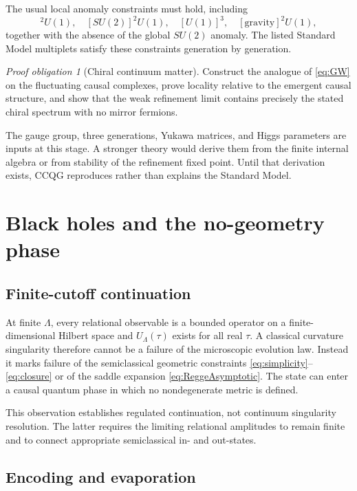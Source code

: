 \documentclass[11pt]{article}
\theoremstyle{remark}
\newtheorem{obligation}[definition]{Proof obligation}
\begin{document}
The usual local anomaly constraints must hold, including
\begin{equation}
 [SU(3)]^2U(1),\quad
 [SU(2)]^2U(1),\quad
 [U(1)]^3,\quad
 [\mathrm{gravity}]^2U(1),
\end{equation}
together with the absence of the global \(SU(2)\) anomaly.  The listed
Standard Model multiplets satisfy these constraints generation by
generation.

\begin{obligation}[Chiral continuum matter]
Construct the analogue of \eqref{eq:GW} on the fluctuating causal
complexes, prove locality relative to the emergent causal structure, and
show that the weak refinement limit contains precisely the stated chiral
spectrum with no mirror fermions.
\label{obl:chiral}
\end{obligation}

The gauge group, three generations, Yukawa matrices, and Higgs parameters
are inputs at this stage.  A stronger theory would derive them from the
finite internal algebra or from stability of the refinement fixed point.
Until that derivation exists, CCQG reproduces rather than explains the
Standard Model.

\section{Black holes and the no-geometry phase}

\subsection{Finite-cutoff continuation}

At finite \(\Lambda\), every relational observable is a bounded operator
on a finite-dimensional Hilbert space and \(U_\Lambda(\tau)\) exists for
all real \(\tau\).  A classical curvature singularity therefore cannot be
a failure of the microscopic evolution law.  Instead it marks failure of
the semiclassical geometric constraints
\eqref{eq:simplicity}--\eqref{eq:closure} or of the saddle expansion
\eqref{eq:ReggeAsymptotic}.  The state can enter a causal quantum phase in
which no nondegenerate metric is defined.

This observation establishes regulated continuation, not continuum
singularity resolution.  The latter requires the limiting relational
amplitudes to remain finite and to connect appropriate semiclassical
in- and out-states.

\subsection{Encoding and evaporation}
\end{document}

